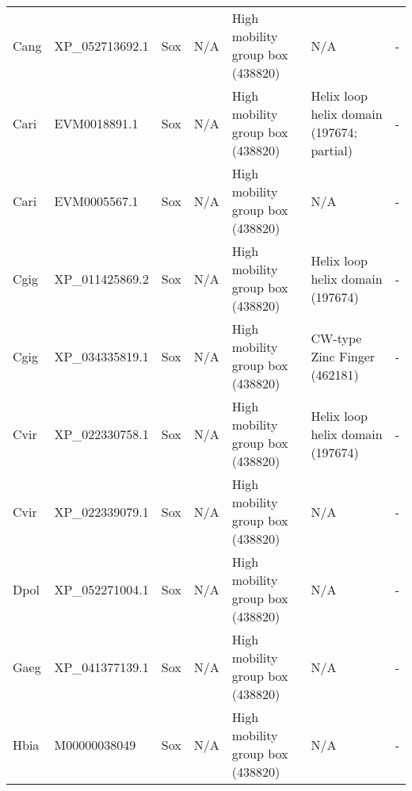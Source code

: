 \documentclass[../main.tex]{subfiles}
\begin{document}
\begin{landscape}
\begin{longtable}{lllllll}
		Cang           & XP\_052713692.1       & Sox            & N/A                 & High mobility group box (438820)            & N/A                                                                    & -                    \\
		Cari           & EVM0018891.1          & Sox            & N/A                 & High mobility group box (438820)            & Helix loop helix domain (197674; partial)                              & -                    \\
		Cari           & EVM0005567.1          & Sox            & N/A                 & High mobility group box (438820)            & N/A                                                                    & -                    \\
		Cgig           & XP\_011425869.2       & Sox            & N/A                 & High mobility group box (438820)            & Helix loop helix domain (197674)                                       & -                    \\
		Cgig           & XP\_034335819.1       & Sox            & N/A                 & High mobility group box (438820)            & CW-type Zinc Finger (462181)                                           & -                    \\
		Cvir           & XP\_022330758.1       & Sox            & N/A                 & High mobility group box (438820)            & Helix loop helix domain (197674)                                       & -                    \\
		Cvir           & XP\_022339079.1       & Sox            & N/A                 & High mobility group box (438820)            & N/A                                                                    & -                    \\
		Dpol           & XP\_052271004.1       & Sox            & N/A                 & High mobility group box (438820)            & N/A                                                                    & -                    \\
		Gaeg           & XP\_041377139.1       & Sox            & N/A                 & High mobility group box (438820)            & N/A                                                                    & -                    \\
		Hbia           & M00000038049          & Sox            & N/A                 & High mobility group box (438820)            & N/A                                                                    & -                    \\

\end{longtable}
\end{landscape}
\end{document}
